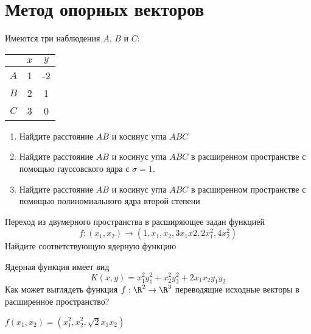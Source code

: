 \documentclass[pdftex,11pt,openany]{book}\usepackage[]{graphicx}\usepackage[]{color}
\begin{document}


\chapter{Метод опорных векторов}


\begin{problem}
Имеются три наблюдения $A$, $B$ и $C$:

\begin{tabular}{ccc}
 & $x$ & $y$ \\ 
\hline 
$A$ & 1 & -2 \\ 
$B$ & 2 & 1 \\ 
$C$ & 3 & 0 \\ 
\end{tabular} 

\begin{enumerate}
\item Найдите расстояние $AB$ и косинус угла $ABC$
\item Найдите расстояние $AB$ и косинус угла $ABC$ в расширенном пространстве с помощью гауссовского ядра с $\sigma=1$.
\item Найдите расстояние $AB$ и косинус угла $ABC$ в расширенном пространстве с помощью полиномиального ядра второй степени
\end{enumerate}
\end{problem}

\begin{solution}
\end{solution}

\begin{problem}
Переход из двумерного пространства в расширяющее задан функцией 
\[
f : (x_1,x_2) \to (1,x_1,x_2,3x_1 x2, 2x_1^2, 4x_2^2)
\]
Найдите соответствующую ядерную функцию
\end{problem}

\begin{solution}
\end{solution}


\begin{problem}
Ядерная функция имеет вид 
\[
K(x,y)=x_1^2y_1^2+x_2^2y_2^2+2x_1x_2y_1y_2
\]
Как может выглядеть функция $f:\R^2\to\R^3$ переводящие исходные векторы в расширенное пространство?
\end{problem}

\begin{solution}
$f(x_1,x_2)=(x_1^2,x_2^2,\sqrt{2}x_1x_2)$
\end{solution}
\end{document}
